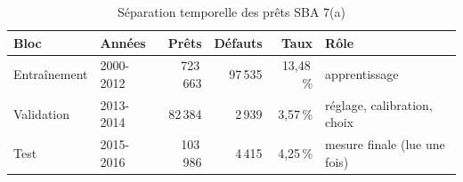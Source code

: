 \begin{table}[htbp]
\centering
\small\setlength{\tabcolsep}{4pt}
\caption{Séparation temporelle des prêts SBA 7(a)}\label{tab:blocs}
\begin{tabular}{llrrrl}
\toprule
Bloc & Années & Prêts & Défauts & Taux & Rôle \\
\midrule
Entraînement & 2000-2012 & 723\,663 & 97\,535 & 13,48\,\% & apprentissage \\
Validation & 2013-2014 & 82\,384 & 2\,939 & 3,57\,\% & réglage, calibration, choix \\
Test & 2015-2016 & 103\,986 & 4\,415 & 4,25\,\% & mesure finale (lue une fois) \\
\bottomrule
\end{tabular}
\end{table}
